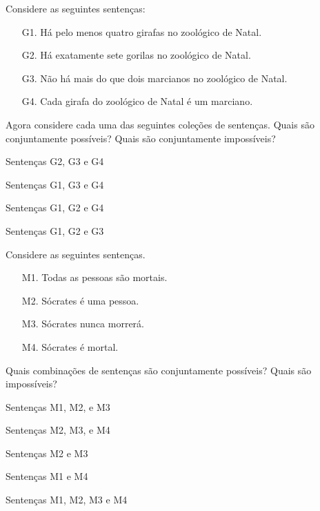 \noindent \problempart Considere as seguintes sentenças: 
\begin{enumerate}%
\item[G1.] \label{itm:at_least_four} Há pelo menos quatro girafas no zoológico de Natal.
\item[G2.] \label{itm:exactly_seven} Há exatamente sete gorilas no zoológico de Natal.
\item[G3.] \label{itm:not_more_than_two} Não há mais do que dois marcianos no zoológico de Natal.
\item[G4.] \label{itm:martians} Cada girafa do zoológico de Natal é um marciano.
\end{enumerate}

Agora considere cada uma das seguintes coleções de sentenças. Quais são conjuntamente possíveis? Quais são conjuntamente impossíveis?
\begin{earg}
\item Sentenças G2, G3 e G4
\item Sentenças G1, G3 e G4
\item Sentenças G1, G2 e G4
\item Sentenças G1, G2 e G3
\end{earg}

\problempart Considere as seguintes sentenças.
\begin{enumerate}%
\item[M1.] \label{itm:allmortal} Todas as pessoas são mortais.
\item[M2.] \label{itm:socperson} Sócrates é uma pessoa.
\item[M3.] \label{itm:socnotdie} Sócrates nunca morrerá.
\item[M4.] \label{itm:socmortal} Sócrates é mortal.
\end{enumerate}
Quais combinações de sentenças são conjuntamente possíveis? Quais são impossíveis?
\begin{earg}
\item Sentenças M1, M2, e M3
\item Sentenças M2, M3, e M4
\item Sentenças M2 e M3
\item Sentenças M1 e M4
\item Sentenças M1, M2, M3 e M4
\end{earg}

